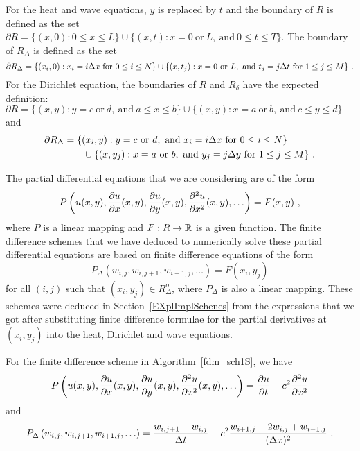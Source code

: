 \begin{egg}
For the heat and wave equations, $y$ is replaced by $t$ and the
boundary of $R$ is defined as the set
$\partial R  = \{ (x,0) : 0 \leq x \leq L \} \cup
\{ (x,t) : x = 0 \ \text{or} \ L, \ \text{and} \ 0 \leq t \leq T \}$.
The boundary of $R_\Delta$ is defined as the set
\[
\partial
R_\Delta = \{ (x_i,0) : x_i = i \Delta{x} \ \text{for} \ 0 \leq i \leq N \}
\cup 
\{ (x,t_j) : x = 0 \ \text{or} \ L ,\ \text{and} \ t_j = j \Delta{t}
\ \text{for} \ 1 \leq j \leq M \} \ .
\]
For the Dirichlet equation, the boundaries of $R$ and
$R_\delta$ have the expected definition:
$\partial R  = \{ (x,y) : y = c \ \text{or} \ d ,\ \text{and}
\ a \leq x \leq b \} \cup
\{ (x,y) : x = a \ \text{or} \ b ,\ \text{and} \ c \leq y \leq d \}$
and
\begin{align*}
\partial
R_\Delta &= \{ (x_i,y) : y = c \ \text{or} \ d ,\ \text{and}
\ x_i = i \Delta{x} \ \text{for} \ 0 \leq i \leq N \} \\
&\qquad \cup 
\{ (x,y_j) : x = a \ \text{or} \ b ,\ \text{and} \ y_j = j \Delta{y}
\ \text{for} \ 1 \leq j \leq M \} \ .
\end{align*}
\end{egg}

The partial differential equations that we are considering are of the form 
\begin{equation} \label{fdm_pde_tr}
P\left(u(x,y), \frac{\partial{u}}{\partial{x}}(x,y), \frac{\partial{u}}{\partial{y}}(x,y),
\frac{\partial^{2}{u}}{\partial{x}^{2}}(x,y), \ldots \right)= F(x,y) \ ,
\end{equation}
where $P$ is a linear mapping and $F:R\to \mathbb{R}$ is a given function.
The finite difference schemes that we have deduced to numerically
solve these partial differential equations are based
on finite difference equations of the form
\begin{equation} \label{fdm_fde_tr}
P_\Delta\left(w_{i,j}, w_{i,j+1}, w_{i+1,j}, \ldots\right)
= F(x_i,y_j)
\end{equation}
for all $(i,j)$ such that $(x_i,y_j) \in R^o_\Delta$, where
$P_\Delta$ is also a linear mapping.  These schemes were deduced
in Section~\ref{EXplImplSchenes} from the expressions that we got
after substituting finite difference formulae for the partial
derivatives at $(x_i,y_j)$ into the heat, Dirichlet and wave equations.

\begin{egg}
For the finite difference scheme in Algorithm~\ref{fdm_sch1S}, we have
\[
P\left(u(x,y), \frac{\partial{u}}{\partial{x}}(x,y), \frac{\partial{u}}{\partial{y}}(x,y),
\frac{\partial^{2}{u}}{\partial{x}^{2}}(x,y), \ldots \right)
= \frac{\partial{u}}{\partial{t}} - c^2 \frac{\partial^{2}{u}}{\partial{x}^{2}}
\]
and
\begin{equation}\label{fdm_PDelta_egg}
  P_\Delta\left(w_{i,j}, w_{i,j+1}, w_{i+1,j}, \ldots\right)
= \frac{w_{i,j+1} - w_{i,j}}{\Delta{t}} - c^2 \frac{w_{i+1,j} - 2w_{i,j} +
w_{i-1,j}}{(\Delta{x})^2} \ .
\end{equation}
\end{egg}

